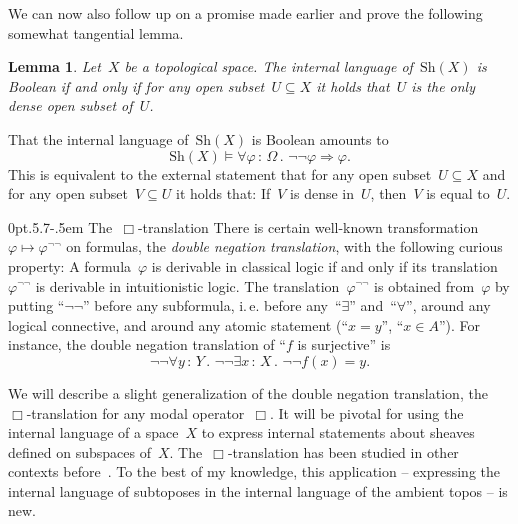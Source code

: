 \documentclass[10pt,reqno,a4paper]{amsbook}
\makeatletter
\theoremstyle{definition}
\theoremstyle{plain}
\newtheorem{lemma}[defn]{Lemma}
\theoremstyle{remark}
\newcommand{\Sh}{\mathrm{Sh}}
\newcommand{\?}{\,{:}\,}
\renewcommand{\_}{\mathpunct{.}\,}
\newcommand{\ie}{i.\,e.\@\xspace}
\renewenvironment{proof}[1][\proofname]{\par
  \pushQED{\qed}%
  \normalfont \topsep6\p@\@plus6\p@\relax
  \trivlist
  \item[\hskip\labelsep
        \itshape
    #1\@addpunct{.}]\ignorespaces
}{%
  \popQED\endtrivlist\@endpefalse
}
\def\subsection{\@startsection{subsection}{2}%
  {0pt}{.5\linespacing\@plus.7\linespacing}{-.5em}%
  {\normalfont\bfseries}}
\makeatother
\begin{document}
We can now also follow up on a promise made earlier and prove the following
somewhat tangential lemma.
\begin{lemma}\label{lemma:boolean-dense}
Let~$X$ be a topological space. The internal language of~$\Sh(X)$ is Boolean if
and only if for any open subset~$U \subseteq X$ it holds that~$U$ is the only
dense open subset of~$U$.
\end{lemma}
\begin{proof}That the internal language of~$\Sh(X)$ is Boolean amounts to
\[ \Sh(X) \models \forall \varphi\?\Omega\_ \neg\neg\varphi \Rightarrow
\varphi. \]
This is equivalent to the external statement that for any open subset~$U
\subseteq X$ and for any open subset~$V \subseteq U$ it holds that: If~$V$ is
dense in~$U$, then~$V$ is equal to~$U$.
\end{proof}


\subsection{\texorpdfstring{The~$\Box$-translation}{The □-translation}}
There is certain well-known transformation~$\varphi
\mapsto \varphi^{\neg\neg}$ on formulas, the \emph{double negation
translation}, with the following curious property: A formula~$\varphi$ is
derivable in classical logic if and only if its
translation~$\varphi^{\neg\neg}$ is derivable in intuitionistic logic. The
translation~$\varphi^{\neg\neg}$ is obtained from~$\varphi$ by putting
``$\neg\neg$'' before any subformula, \ie before any~``$\exists$''
and~``$\forall$'', around any logical connective, and around any atomic
statement (``$x=y$'', ``$x \in A$''). For instance, the double negation
translation of ``$f$ is surjective'' is
\[ \neg\neg \forall y\?Y\_ \neg\neg \exists x\?X\_ \neg\neg f(x) = y. \]

We will describe a slight generalization of the double negation translation,
the~$\Box$-translation for any modal operator~$\Box$. It will be pivotal
for using the internal language of a space~$X$ to express internal statements
about sheaves defined on subspaces of~$X$. The~$\Box$-translation has been studied
in other contexts
before~\cite{aczel:russell-prawitz,escardo:oliva:peirce-shift}. To the best of
my knowledge, this application -- expressing the internal language of
subtoposes in the internal language of the ambient topos -- is new.
\end{document}
